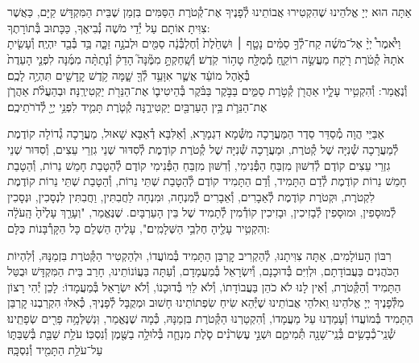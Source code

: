 \documentclass[twoside, openany, parskip=half, 11pt]{book}
\begin{document}
\newcommand{\ketoret}{
אַתָּה הוּא יְיָ אֱלֹהֵינוּ שֶׁהִקְטִירוּ אֲבוֹתֵינוּ לְ֯פָנֶיךָ אֶת־קְ֯טֹרֶת הַסַּמִּים בִּזְמַן שֶׁבֵּית הַמִּקְדָּשׁ קַיָּם, כַּאֲשֶׁר צִוִּיתָ אוֹתָם עַל יְ֯דֵי מֹשֶׁה נְ֯בִיאֶךָ, כַּכָּתוּב בְּ֯תוֹרָתֶךָ:\\
וַיֹּ֩אמֶר֩ יְיָ֨ אֶל־מֹשֶׁ֜ה קַח־לְ֯ךָ֣ סַמִּ֗ים\source{שמות ל} נָטָ֤ף ׀ וּשְׁחֵ֙לֶת֙ וְ֯חֶלְבְּ֯נָ֔ה סַמִּ֖ים וּלְבֹנָ֣ה זַכָּ֑ה בַּ֥ד בְּ֯בַ֖ד יִהְיֶֽה׃ וְ֯עָשִׂ֤יתָ אֹתָהּ֙ קְ֯טֹ֔רֶת רֹ֖קַח מַעֲשֵׂ֣ה רוֹקֵ֑חַ מְ֯מֻלָּ֖ח טָה֥וֹר קֹֽדֶשׁ׃ וְ֯שָֽׁחַקְתָּ֣ מִמֶּ֘נָּה֮ הָדֵק֒ וְ֯נָתַתָּ֨ה מִמֶּ֜נָּה לִפְנֵ֤י הָעֵדֻת֙ בְּ֯אֹ֣הֶל מוֹעֵ֔ד אֲשֶׁ֛ר אִוָּעֵ֥ד לְ֯ךָ֖ שָׁ֑מָּה קֹ֥דֶשׁ קׇֽדָשִׁ֖ים תִּהְיֶ֥ה לָכֶֽם׃\\
וְ֯נֶאֱמַר: וְ֯הִקְטִ֥יר עָלָ֛יו אַהֲרֹ֖ן קְ֯טֹ֣רֶת סַמִּ֑ים בַּבֹּ֣קֶר בַּבֹּ֗קֶר בְּ֯הֵיטִיב֛וֹ אֶת־הַנֵּרֹ֖ת יַקְטִירֶֽנָּה׃ וּבְהַעֲלֹ֨ת אַהֲרֹ֧ן אֶת־הַנֵּרֹ֛ת בֵּ֥ין הָעַרְבַּ֖יִם יַקְטִירֶ֑נָּה קְ֯טֹ֧רֶת תָּמִ֛יד לִפְנֵ֥י יְיָ֖ לְ֯דֹרֹתֵיכֶֽם׃


}
\\
\tamid
\\
\ketoret
אַבַּיֵּי הֲוָה מְ֯סַדֵּר סֵדֶר הַמַּעֲרָכָה  מִשְּׁ֯מָא דִגְמָרָא, וְ֯אַלִּבָּא דְ֯אַבָּא שָׁאוּל, מַעֲרָכָה גְ֯דוֹלָה קוֹדֶמֶת לְ֯מַעֲרָכָה שְׁ֯נִיָּה שֶׁל קְ֯טֹרֶת, וּמַעֲרָכָה שְׁ֯נִיָּה שֶׁל קְ֯טֹרֶת קוֹדֶמֶת לְ֯סִדּוּר שְׁנֵי גִזְרֵי עֵצִים, וְ֯סִדּוּר שְׁנֵי גִזְרֵי עֵצִים קוֹדֶם לְ֯דִשּׁוּן מִזְבֵּחַ הַפְּ֯נִימִי, וְ֯דִשּׁוּן מִזְבֵּחַ הַפְּ֯נִימִי קוֹדֶם לְ֯הַטָבַת חָמֵשׁ נֵרוֹת, וְ֯הַטָבַת חָמֵשׁ נֵרוֹת קוֹדֶמֶת לְ֯דַם הַתָּמִיד, וְ֯דַם הַתָּמִיד קוֹדֶם לְ֯הַטָבַת שְׁתֵּי נֵרוֹת, וְ֯הַטָבַת שְׁתֵּי נֵרוֹת קוֹדֶמֶת לִקְטֹרֶת, וּקְטֹרֶת קוֹדֶמֶת לְ֯אֵבָרִים, וְ֯אֵבָרִים לְ֯מִנְחָה, וּמִנְחָה לַחֲבִתִּין, וַחֲבִתִּין לִנְסָכִין, וּנְסָכִין לְ֯מוּסָפִין, וּמוּסָפִין לְ֯בָזִיכִין, וּבָזִיכִין קוֹדְ֯מִין לְ֯תָמִיד שֶׁל בֵּין הָעַרְבָּיִם. שֶׁנֶּאֱמַר, "וְעָרַ֤ךְ  עָלֶ֙יהָ֙ הָֽעֹלָ֔ה וְהִקְטִ֥יר עָלֶ֖יהָ חֶלְבֵ֥י הַשְּׁלָמִֽים׃", עָלֶיהָ הַשְׁלֵם כָּל הַקָּרְ֯בָּנוֹת כֻּלָּם:

רִבּוֹן הָעוֹלָמִים, אַתָּה צִוִּיתָנוּ, לְ֯הַקְרִיב קׇרְבַּן הַתָּמִיד בְּ֯מוֹעֲדוֹ, וּלְהַקְטִיר הַקְּ֯טֹרֶת בִּזְמַנָּהּ, וְ֯לִהְיוֹת הַכֹּהֲנִים בַּעֲבוֹדָתָם, וּלְוִיִּם בְּ֯דוּכָנָם, וְ֯יִשְׂרָאֵל בְּ֯מַעֲמָדָם, וְ֯עַתָּה בַּעֲוֹנוֹתֵינוּ, חָרַב בֵּית הַמִּקְדָּשׁ וּבֻטַּל הַתָּמִיד וְ֯הַקְּ֯טֹרֶת, וְ֯אֵין לָנוּ לֹא כֹהֵן בַּעֲבוֹדָתוֹ, וְ֯לֹא לֵוִי בְּ֯דוּכָנוֹ, וְ֯לֹא יִשְׂרָאֵל בְּ֯מַעֲמָדוֹ: לָכֵן יְ֯הִי רָצוֹן מִלְּ֯פָנֶיךָ יְיָ אֱלֹהֵינוּ וֵאלֹהֵי אֲבוֹתֵינוּ שֶׁיְּ֯הֵא שִׂיחַ שִׂפְתוֹתֵינוּ חָשׁוּב וּמְקֻבָּל לְ֯פָנֶיךָ, כְּ֯אִלּוּ הִקְרַבְנוּ קׇרְבַּן הַתָּמִיד בְּ֯מוֹעֲדוֹ וְ֯עָמַדְנוּ עַל מַעֲמָדוֹ, וְ֯הִקְטַרְנוּ הַקְּ֯טֹרֶת בִּזְמַנָּהּ, כְּ֯מָה שֶׁנֶּאֱמַר, וּֽנְשַׁלְּמָ֥ה  פָרִ֖ים שְׂפָתֵֽינוּ׃\\
\shabbos
{}
שְׁ֯נֵֽי־כְ֯בָשִׂ֥ים בְּ֯נֵֽי־שָׁנָ֖ה תְּ֯מִימִ֑ם וּשְׁנֵ֣י עֶשְׂרֹנִ֗ים סֹ֧לֶת מִנְחָ֛ה בְּ֯לוּלָ֥ה בַשֶּׁ֖מֶן וְ֯נִסְכּֽוֹ׃
עֹלַ֥ת שַׁבַּ֖ת בְּ֯שַׁבַּתּ֑וֹ עַל־עֹלַ֥ת הַתָּמִ֖יד וְ֯נִסְכָּֽהּ׃
\end{document}
